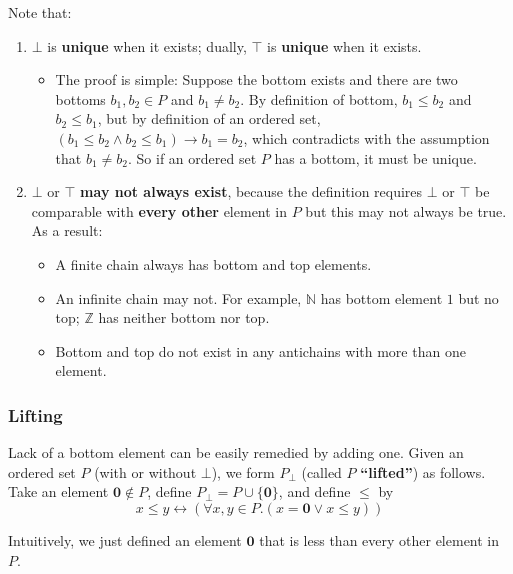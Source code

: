 \documentclass[12pt, letterpaper, oneside]{book}
\begin{document}
Note that:
\begin{enumerate}
  \item $\bot$ is \textbf{unique} when it exists; dually, $\top$ is \textbf{unique} when it exists.
        \begin{itemize}
          \item The proof is simple: Suppose the bottom exists and there are two bottoms $b_1, b_2 \in P$ and $b_1 \ne b_2$.
                By definition of bottom, $b_1 \leqslant b_2$ and $b_2 \leqslant b_1$, but by definition of an ordered
                set, $(b_1 \leqslant b_2 \land b_2 \leqslant b_1) \rightarrow b_1 = b_2$, which contradicts with the
                assumption that $b_1 \ne b_2$. So if an ordered set $P$ has a bottom, it must be unique.
        \end{itemize}
  \item $\bot$ or $\top$ \textbf{may not always exist}, because the definition requires $\bot$ or $\top$ be comparable
        with \textbf{every other} element in $P$ but this may not always be true. As a result:
        \begin{itemize}
          \item A finite chain always has bottom and top elements.
          \item An infinite chain may not. For example, $\mathbb{N}$ has bottom element $1$ but no top; $\mathbb{Z}$
                has neither bottom nor top.
          \item Bottom and top do not exist in any antichains with more than one element.
        \end{itemize}
\end{enumerate}

\subsubsection{Lifting} \label{ch01-lifting}

Lack of a bottom element can be easily remedied by adding one. Given an ordered set $P$ (with or without $\bot$), we
form $P_{\bot}$ (called $P$ \textbf{``lifted''}) as follows. Take an element $\mathbf{0} \notin P$, define $P_{\bot} =
  P \cup \{\mathbf{0}\}$, and define $\leqslant$ by
\[x \leqslant y \leftrightarrow (\forall x, y \in P. (x = \mathbf{0} \lor x \leqslant y))\]

Intuitively, we just defined an element $\mathbf{0}$ that is less than every other element in $P$.
\end{document}
